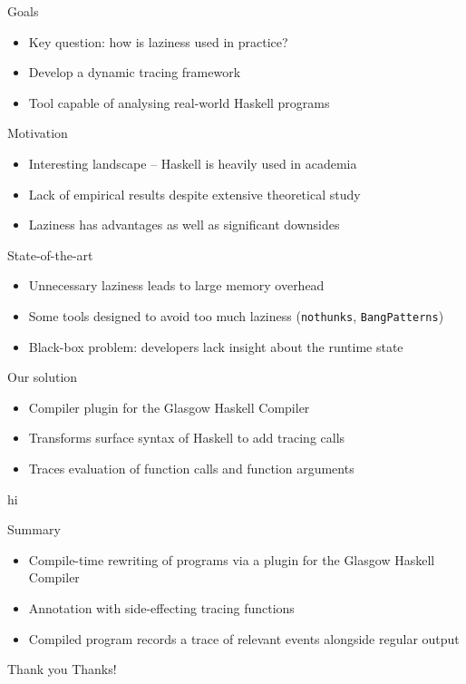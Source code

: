 \documentclass[aspectratio=169]{beamer}
\begin{document}
\begin{frame}{Goals}
	\begin{itemize}
		\item Key question: how is laziness used in practice? \pause
		\item Develop a \alert{dynamic tracing} framework \pause
		\item Tool capable of analysing real-world Haskell programs
	\end{itemize}
\end{frame}

\begin{frame}{Motivation}
	\begin{itemize}
		\item Interesting landscape -- Haskell is heavily used in academia
			\pause
		\item Lack of empirical results despite extensive theoretical study
			\pause
		\item Laziness has advantages as well as significant downsides
	\end{itemize}
\end{frame}

\begin{frame}{State-of-the-art}
	\begin{itemize}
		\item Unnecessary laziness leads to \alert{large memory overhead}
			\pause
		\item Some tools designed to avoid too much laziness
			(\texttt{nothunks}, \texttt{BangPatterns}) \pause
		\item Black-box problem: developers lack insight about the runtime
			state
	\end{itemize}
\end{frame}

\begin{frame}{Our solution}
	\begin{overprint}
		\begin{itemize}
			\item<1-3> Compiler plugin for the \alert{Glasgow Haskell Compiler}
			\item<2-3> Transforms surface syntax of Haskell to add tracing calls
			\item<3> Traces evaluation of function calls and function arguments
		\end{itemize}
		hi
	\end{overprint}
\end{frame}

\begin{frame}{Summary}
	\begin{itemize}
		\item Compile-time \alert{rewriting of programs} via a plugin for
			the Glasgow Haskell Compiler \pause
		\item Annotation with side-effecting tracing functions \pause
		\item Compiled program records a trace of relevant events alongside
			regular output
	\end{itemize}
\end{frame}

\begin{frame}{Thank you}
	Thanks!
\end{frame}
\end{document}
